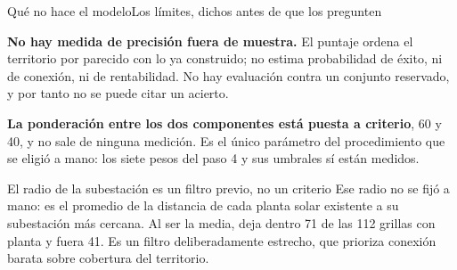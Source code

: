 \documentclass[aspectratio=169, 11pt]{beamer}
\begin{document}
%
\begin{frame}{Qué no hace el modelo}{Los límites, dichos antes de que los pregunten}
  \vspace{0.6em}
  \hspace{0.01\textwidth}\begin{minipage}{0.96\textwidth}
    \raggedright\small\textcolor{tinta2}{\textbf{No hay medida de precisión fuera de
    muestra.} El puntaje ordena el territorio por parecido con lo ya construido; no
    estima probabilidad de éxito, ni de conexión, ni de rentabilidad. No hay
    evaluación contra un conjunto reservado, y por tanto no se puede citar un acierto.

    \vspace{1.0em}
    \textbf{La ponderación entre los dos componentes está puesta a criterio}, 60 y 40,
    y no sale de ninguna medición. Es el único parámetro del procedimiento que se
    eligió a mano: los siete pesos del paso 4 y sus umbrales sí están medidos.}
  \end{minipage}
\end{frame}

\begin{frame}{El radio de la subestación es un filtro previo, no un criterio}
  {Ese radio no se fijó a mano: es el promedio de la distancia de cada planta solar
  existente a su subestación más cercana. Al ser la media, deja dentro 71 de las 112
  grillas con planta y fuera 41. Es un filtro deliberadamente estrecho, que prioriza
  conexión barata sobre cobertura del territorio.}

  \vspace{0.6em}
  \hspace{0.01\textwidth}\begin{minipage}{0.96\textwidth}
    \raggedright
    \hfill
    \hfill
  \end{minipage}
\end{frame}
\end{document}
